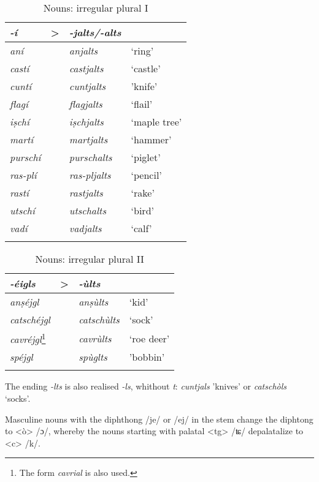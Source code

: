 \begin{table}
\caption{Nouns: irregular plural I}
\label{irregplI}
 \begin{tabular}{llll}
  \lsptoprule
   \textit{-í} & > & \textit{-jalts/-alts}  \\
  \midrule
\textit{aní} && \textit{anjalts} & `ring'\\
\textit{castí} && \textit{castjalts} & `castle' \\
\textit{cuntí} && \textit{cuntjalts} & 'knife' \\
\textit{flagí}  &&   \textit{flagjalts} & `flail' \\
\textit{iṣchí} && \textit{iṣchjalts} & `maple tree'\\
\textit{martí} && \textit{martjalts} &`hammer'\\
\textit{purschí} && \textit{purschalts} & `piglet'\\
\textit{ras-plí} && \textit{ras-pljalts} & `pencil'\\
\textit{rastí} && \textit{rastjalts} & `rake'\\
\textit{utschí} && \textit{utschalts}  &`bird'\\
\textit{vadí} && \textit{vadjalts} & `calf'\\
  \lspbottomrule
 \end{tabular}
\end{table}

\begin{table}
\caption{Nouns: irregular plural II}
\label{irregplII}
 \begin{tabular}{llll}
  \lsptoprule
    \textit{-éigls} & > & \textit{-ùlts}\\
  \midrule
\textit{anṣéjgl} && \textit{anṣùlts} & `kid'\\
\textit{catschéjgl} && \textit{catschùlts} & `sock'\\
\textit{cavréjgl}\footnote{The form \textit{cavrial} is also used.} && \textit{cavrùlts} & `roe deer'\\
\textit{spéjgl} && \textit{spùglts} & 'bobbin'\\
 \lspbottomrule
 \end{tabular}
\end{table}

The ending \textit{-lts } is also realised \textit{-ls}, whithout \textit{t}: \textit{cuntjals} 'knives' or \textit{catschòls} `socks'.

Masculine nouns with the diphthong /je/ or /ej/ in the stem change the diphtong to <ò> /ɔ/, whereby the nouns starting with palatal <tg> /ʨ/ depalatalize to <c> /k/.


